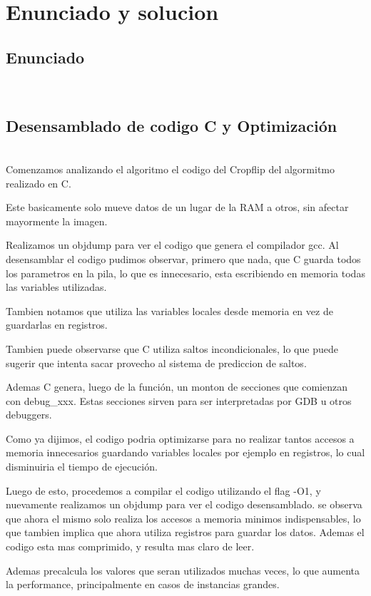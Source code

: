 \documentclass[a4paper]{article}
\begin{document}
\section{Enunciado y solucion} 

\subsection{Enunciado}


\
\newpage

\subsection{Desensamblado de codigo C y Optimización}
\\
Comenzamos analizando el algoritmo el codigo del Cropflip del algormitmo realizado en C.

Este basicamente solo mueve datos de un lugar de la RAM a otros, sin afectar mayormente la imagen.

Realizamos un objdump para ver el codigo que genera el compilador gcc. Al desensamblar el codigo pudimos observar, primero que nada, que C guarda todos los parametros en la pila, lo que es innecesario, esta escribiendo en memoria todas las variables utilizadas.

Tambien notamos que utiliza las variables locales desde memoria en vez de guardarlas en registros.

Tambien puede observarse que C utiliza saltos incondicionales, lo que puede sugerir que intenta sacar provecho al sistema de prediccion de saltos.

Ademas C genera, luego de la función, un monton de secciones que comienzan con debug_xxx. Estas secciones sirven para ser interpretadas por GDB u otros debuggers.

Como ya dijimos, el codigo podria optimizarse para no realizar tantos accesos a memoria innecesarios guardando variables locales por ejemplo en registros, lo cual disminuiria el tiempo de ejecución.

Luego de esto, procedemos a compilar el codigo utilizando el flag -O1, y nuevamente realizamos un objdump para ver el codigo desensamblado. se observa que ahora el mismo solo realiza los accesos a memoria minimos indispensables, lo que tambien implica que ahora utiliza registros para guardar los datos. Ademas el codigo esta mas comprimido, y resulta mas claro de leer.

Ademas precalcula los valores que seran utilizados muchas veces, lo que aumenta la performance, principalmente en casos de instancias grandes.
\end{document}
